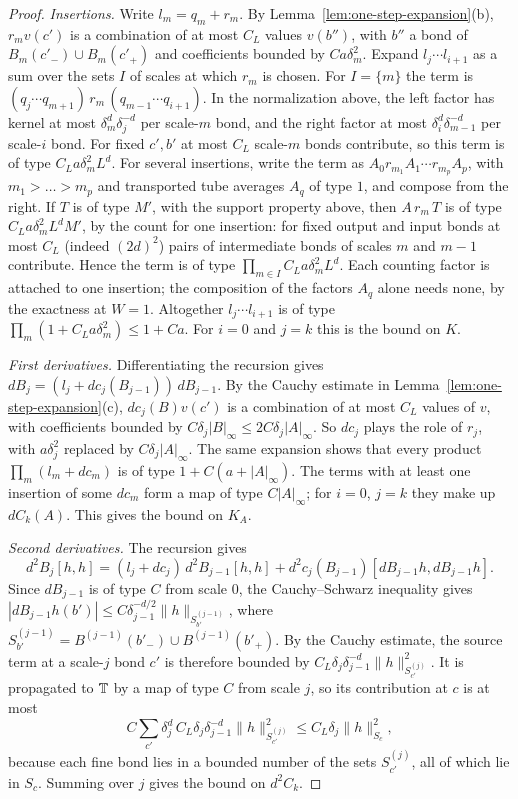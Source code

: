 \begin{proof}
\emph{Insertions.} Write $l_m=q_m+r_m$. By Lemma~\ref{lem:one-step-expansion}(b), $r_mv(c')$ is a combination of at most $C_L$ values $v(b'')$, with $b''$ a bond of $B_m(c'_-)\cup B_m(c'_+)$ and coefficients bounded by $Ca\delta_m^2$. Expand $l_j\cdots l_{i+1}$ as a sum over the sets $I$ of scales at which $r_m$ is chosen. For $I=\{m\}$ the term is $(q_j\cdots q_{m+1})\,r_m\,(q_{m-1}\cdots q_{i+1})$. In the normalization above, the left factor has kernel at most $\delta_m^d\delta_j^{-d}$ per scale-$m$ bond, and the right factor at most $\delta_i^d\delta_{m-1}^{-d}$ per scale-$i$ bond. For fixed $c',b'$ at most $C_L$ scale-$m$ bonds contribute, so this term is of type $C_La\delta_m^2L^d$. For several insertions, write the term as $A_0r_{m_1}A_1\cdots r_{m_p}A_p$, with $m_1>\dots>m_p$ and transported tube averages $A_q$ of type $1$, and compose from the right. If $T$ is of type $M'$, with the support property above, then $A\,r_m\,T$ is of type $C_La\delta_m^2L^dM'$, by the count for one insertion: for fixed output and input bonds at most $C_L$ (indeed $(2d)^2$) pairs of intermediate bonds of scales $m$ and $m-1$ contribute. Hence the term is of type $\prod_{m\in I}C_La\delta_m^2L^d$. Each counting factor is attached to one insertion; the composition of the factors $A_q$ alone needs none, by the exactness at $W=1$. Altogether $l_j\cdots l_{i+1}$ is of type $\prod_m(1+C_La\delta_m^2)\le1+Ca$. For $i=0$ and $j=k$ this is the bound on $K$.

\emph{First derivatives.} Differentiating the recursion gives $dB_j=(l_j+dc_j(B_{j-1}))\,dB_{j-1}$. By the Cauchy estimate in Lemma~\ref{lem:one-step-expansion}(c), $dc_j(B)v(c')$ is a combination of at most $C_L$ values of $v$, with coefficients bounded by $C\delta_j|B|_\infty\le2C\delta_j|A|_\infty$. So $dc_j$ plays the role of $r_j$, with $a\delta_j^2$ replaced by $C\delta_j|A|_\infty$. The same expansion shows that every product $\prod_m(l_m+dc_m)$ is of type $1+C(a+|A|_\infty)$. The terms with at least one insertion of some $dc_m$ form a map of type $C|A|_\infty$; for $i=0$, $j=k$ they make up $dC_k(A)$. This gives the bound on $K_A$.

\emph{Second derivatives.} The recursion gives
\[
d^2B_j[h,h]=(l_j+dc_j)\,d^2B_{j-1}[h,h]+d^2c_j(B_{j-1})[dB_{j-1}h,dB_{j-1}h].
\]
Since $dB_{j-1}$ is of type $C$ from scale $0$, the Cauchy--Schwarz inequality gives $|dB_{j-1}h(b')|\le C\delta_{j-1}^{-d/2}\|h\|_{S^{(j-1)}_{b'}}$, where $S^{(j-1)}_{b'}=B^{(j-1)}(b'_-)\cup B^{(j-1)}(b'_+)$. By the Cauchy estimate, the source term at a scale-$j$ bond $c'$ is therefore bounded by $C_L\delta_j\delta_{j-1}^{-d}\|h\|^2_{S^{(j)}_{c'}}$. It is propagated to $\mathbb T$ by a map of type $C$ from scale $j$, so its contribution at $c$ is at most
\[
C\sum_{c'}\delta_j^d\,C_L\delta_j\delta_{j-1}^{-d}\|h\|^2_{S^{(j)}_{c'}}\le C_L\delta_j\|h\|^2_{S_c},
\]
because each fine bond lies in a bounded number of the sets $S^{(j)}_{c'}$, all of which lie in $S_c$. Summing over $j$ gives the bound on $d^2C_k$.


\end{proof}

